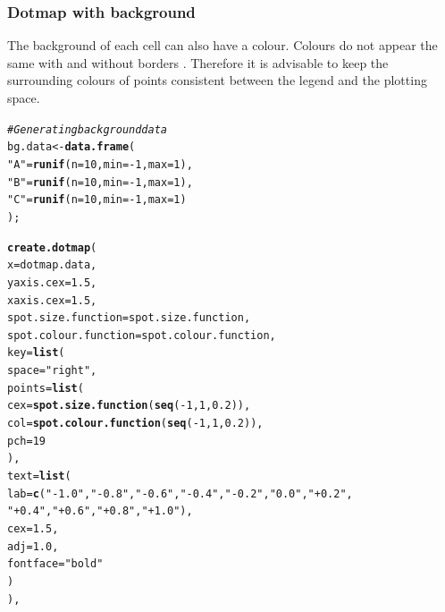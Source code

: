 \documentclass[letterpaper]{article}\usepackage[]{graphicx}\usepackage[]{color}
\makeatletter
\newcommand{\hlnum}[1]{\textcolor[rgb]{0.686,0.059,0.569}{#1}}%
\newcommand{\hlstr}[1]{\textcolor[rgb]{0.192,0.494,0.8}{#1}}%
\newcommand{\hlcom}[1]{\textcolor[rgb]{0.678,0.584,0.686}{\textit{#1}}}%
\newcommand{\hlopt}[1]{\textcolor[rgb]{0,0,0}{#1}}%
\newcommand{\hlstd}[1]{\textcolor[rgb]{0.345,0.345,0.345}{#1}}%
\newcommand{\hlkwb}[1]{\textcolor[rgb]{0.69,0.353,0.396}{#1}}%
\newcommand{\hlkwc}[1]{\textcolor[rgb]{0.333,0.667,0.333}{#1}}%
\newcommand{\hlkwd}[1]{\textcolor[rgb]{0.737,0.353,0.396}{\textbf{#1}}}%
\newenvironment{kframe}{%
 \def\at@end@of@kframe{}%
 \ifinner\ifhmode%
  \def\at@end@of@kframe{\end{minipage}}%
  \begin{minipage}{\columnwidth}%
 \fi\fi%
 \def\FrameCommand##1{\hskip\@totalleftmargin \hskip-\fboxsep
 \colorbox{shadecolor}{##1}\hskip-\fboxsep
     \hskip-\linewidth \hskip-\@totalleftmargin \hskip\columnwidth}%
 \MakeFramed {\advance\hsize-\width
   \@totalleftmargin\z@ \linewidth\hsize
   \@setminipage}}%
 {\par\unskip\endMakeFramed%
 \at@end@of@kframe}
\newenvironment{knitrout}{}{} %
\makeatother
\begin{document}
\subsubsection{Dotmap with background}
The background of each cell can also have a colour. Colours do not appear the same with and without borders \cite{brewer-colour}. Therefore it is advisable to keep the surrounding colours of points consistent between the legend and the plotting space.

\begin{knitrout}
\color{fgcolor}\begin{kframe}
\begin{alltt}
\hlcom{# Generating background data}
\hlstd{bg.data} \hlkwb{<-} \hlkwd{data.frame}\hlstd{(}
    \hlstr{"A"} \hlstd{=} \hlkwd{runif}\hlstd{(}\hlkwc{n} \hlstd{=} \hlnum{10}\hlstd{,} \hlkwc{min} \hlstd{=} \hlopt{-}\hlnum{1}\hlstd{,} \hlkwc{max} \hlstd{=} \hlnum{1}\hlstd{),}
    \hlstr{"B"} \hlstd{=} \hlkwd{runif}\hlstd{(}\hlkwc{n} \hlstd{=} \hlnum{10}\hlstd{,} \hlkwc{min} \hlstd{=} \hlopt{-}\hlnum{1}\hlstd{,} \hlkwc{max} \hlstd{=} \hlnum{1}\hlstd{),}
    \hlstr{"C"} \hlstd{=} \hlkwd{runif}\hlstd{(}\hlkwc{n} \hlstd{=} \hlnum{10}\hlstd{,} \hlkwc{min} \hlstd{=} \hlopt{-}\hlnum{1}\hlstd{,} \hlkwc{max} \hlstd{=} \hlnum{1}\hlstd{)}
    \hlstd{);}

\hlkwd{create.dotmap}\hlstd{(}
    \hlkwc{x} \hlstd{= dotmap.data,}
    \hlkwc{yaxis.cex} \hlstd{=} \hlnum{1.5}\hlstd{,}
    \hlkwc{xaxis.cex} \hlstd{=} \hlnum{1.5}\hlstd{,}
    \hlkwc{spot.size.function} \hlstd{= spot.size.function,}
    \hlkwc{spot.colour.function} \hlstd{= spot.colour.function,}
    \hlkwc{key} \hlstd{=} \hlkwd{list}\hlstd{(}
        \hlkwc{space} \hlstd{=} \hlstr{"right"}\hlstd{,}
        \hlkwc{points} \hlstd{=} \hlkwd{list}\hlstd{(}
            \hlkwc{cex} \hlstd{=} \hlkwd{spot.size.function}\hlstd{(}\hlkwd{seq}\hlstd{(}\hlopt{-}\hlnum{1}\hlstd{,} \hlnum{1}\hlstd{,} \hlnum{0.2}\hlstd{)),}
            \hlkwc{col} \hlstd{=} \hlkwd{spot.colour.function}\hlstd{(}\hlkwd{seq}\hlstd{(}\hlopt{-}\hlnum{1}\hlstd{,} \hlnum{1}\hlstd{,} \hlnum{0.2}\hlstd{)),}
            \hlkwc{pch} \hlstd{=} \hlnum{19}
            \hlstd{),}
        \hlkwc{text} \hlstd{=} \hlkwd{list}\hlstd{(}
            \hlkwc{lab} \hlstd{=} \hlkwd{c}\hlstd{(}\hlstr{"-1.0"}\hlstd{,} \hlstr{"-0.8"}\hlstd{,} \hlstr{"-0.6"}\hlstd{,} \hlstr{"-0.4"}\hlstd{,} \hlstr{"-0.2"}\hlstd{,} \hlstr{" 0.0"}\hlstd{,} \hlstr{"+0.2"}\hlstd{,}
                \hlstr{"+0.4"}\hlstd{,} \hlstr{"+0.6"}\hlstd{,} \hlstr{"+0.8"}\hlstd{,} \hlstr{"+1.0"}\hlstd{),}
            \hlkwc{cex} \hlstd{=} \hlnum{1.5}\hlstd{,}
            \hlkwc{adj} \hlstd{=} \hlnum{1.0}\hlstd{,}
            \hlkwc{fontface} \hlstd{=} \hlstr{"bold"}
            \hlstd{)}
        \hlstd{),}


\end{alltt}
\end{kframe}
\end{knitrout}
\end{document}

